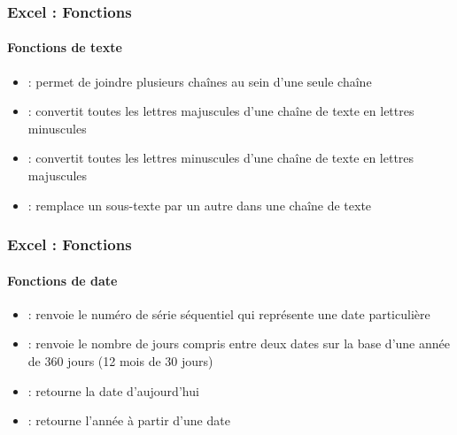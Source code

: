 \documentclass[xcolor=table, usenames,dvipsnames]{beamer}
\begin{document}
\begin{frame}
\frametitle{Excel : Fonctions}
\framesubtitle{Fonctions de texte}

\begin{minipage}{0.69\textwidth}
	\begin{itemize}
		\item {} : permet de joindre plusieurs chaînes au sein d’une seule chaîne
		\item {} : convertit toutes les lettres majuscules d'une chaîne de texte en lettres minuscules
		\item {} : convertit toutes les lettres minuscules d'une chaîne de texte en lettres majuscules
		\item {} : remplace un sous-texte par un autre dans une chaîne de texte
	\end{itemize}
\end{minipage}
%
\begin{minipage}{0.3\textwidth} 
	
\end{minipage}

\end{frame}

\begin{frame}
\frametitle{Excel : Fonctions}
\framesubtitle{Fonctions de date}

\begin{minipage}{0.69\textwidth}
	\begin{itemize}
		\item {} : renvoie le numéro de série séquentiel qui représente une date particulière
		\item {} : renvoie le nombre de jours compris entre deux dates sur la base d’une année de 360 jours (12 mois de 30 jours)
		\item {} : retourne la date d'aujourd'hui
		\item {} : retourne l'année à partir d'une date
	\end{itemize}
\end{minipage}
%
\begin{minipage}{0.3\textwidth} 
	
\end{minipage}

\end{frame}
\end{document}
